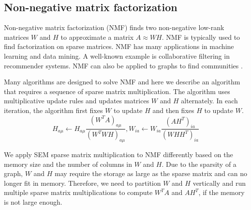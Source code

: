 \subsection{Non-negative matrix factorization}
Non-negative matrix factorization (NMF) \cite{nmf} finds two non-negative
low-rank matrices $W$ and $H$ to approximate a matrix $A \approx WH$. NMF is
typically used to find factorization on sparse matrices. NMF has many applications
in machine learning
and data mining. A well-known example is collaborative filtering \cite{cf} in
recommender systems. NMF can also be applied to graphs to find communities
\cite{yang13, wang11}.

Many algorithms are designed to solve NMF and here we describe an algorithm
\cite{nmf} that requires a sequence of sparse matrix multiplication.
The algorithm uses multiplicative update rules and updates matrices $W$ and $H$
alternately. In each iteration, the algorithm first fixes $W$ to update $H$
and then fixes $H$ to update $W$.
\begin{equation*}
H_{a\mu} \leftarrow H_{a\mu} \frac{{(W^TA)}_{a\mu}}{{(W^TWH)}_{a\mu}},
W_{ia} \leftarrow W_{ia} \frac{{(AH^T)}_{ia}}{{(WHH^T)}_{ia}}
\end{equation*}

We apply SEM sparse matrix multiplication to NMF differently
based on the memory size and the number of columns in $W$ and $H$. Due to
the sparsity of a graph, $W$ and $H$ may require the storage as large as
the sparse matrix and can no longer fit in
memory. Therefore, we need to partition $W$ and $H$ vertically and run multiple
sparse matrix multiplications to compute $W^TA$ and $AH^T$, if the memory is not
large enough.


